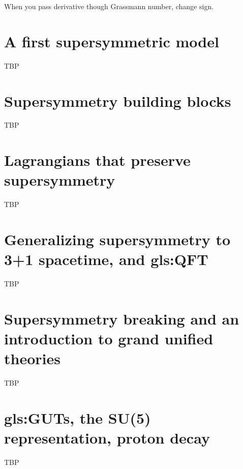 \documentclass[]{article}
\begin{document}
When you pass derivative though Grassmann number, change sign.

\section{A first supersymmetric model}

TBP

\section{Supersymmetry building blocks}

TBP

\section{Lagrangians that preserve supersymmetry}

TBP

\section{Generalizing supersymmetry to 3+1 spacetime, and \gls{gls:QFT}}

TBP

\section{Supersymmetry breaking and an introduction to grand unified theories}

TBP

\section{\gls{gls:GUT}s, the SU(5) representation, proton decay}

TBP

\printglossaries

\raggedright

\end{document}
